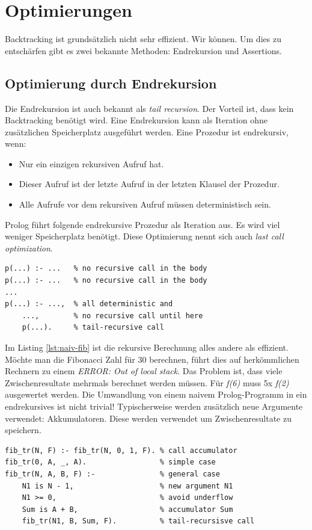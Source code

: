 \section{Optimierungen}
Backtracking ist grundsätzlich nicht sehr effizient. Wir können. Um dies zu entschärfen gibt es zwei bekannte Methoden: Endrekursion und Assertions.

\subsection{Optimierung durch Endrekursion}
Die Endrekursion ist auch bekannt als \emph{tail recursion}. Der Vorteil ist, dass kein Backtracking benötigt wird. Eine Endrekursion kann als Iteration ohne zusätzlichen Speicherplatz ausgeführt werden. Eine Prozedur ist endrekursiv, wenn:

\begin{itemize}
	\item Nur ein einzigen rekursiven Aufruf hat.
	\item Dieser Aufruf ist der letzte Aufruf in der letzten Klausel der Prozedur.
	\item Alle Aufrufe vor dem rekursiven Aufruf müssen deterministisch sein.
\end{itemize}

Prolog führt folgende endrekursive Prozedur als Iteration aus. Es wird viel weniger Speicherplatz benötigt. Diese Optimierung nennt sich auch \emph{last call optimization}.

\begin{lstlisting}[caption=Endrekursion: Allg. Beispiel]
p(...) :- ... 	% no recursive call in the body
p(...) :- ... 	% no recursive call in the body
...
p(...) :- ..., 	% all deterministic and
	..., 		% no recursive call until here
	p(...). 	% tail-recursive call
\end{lstlisting}

Im Listing \ref{lst:naiv-fib} ist die rekursive Berechnung alles andere als effizient. Möchte man die Fibonacci Zahl für 30 berechnen, führt dies auf herkömmlichen Rechnern zu einem \emph{ERROR: Out of local stack}. Das Problem ist, dass viele Zwischenresultate mehrmals berechnet werden müssen. Für \emph{f(6)} muss 5x \emph{f(2)} ausgewertet werden. Die Umwandlung von einem naivem Prolog-Programm in ein endrekursives ist nicht trivial! Typischerweise werden zusätzlich neue Argumente verwendet: Akkumulatoren. Diese werden verwendet um Zwischenresultate zu speichern.

\begin{lstlisting}[caption=Endrekursive Fibonnaci-Berechnung]
fib_tr(N, F) :- fib_tr(N, 0, 1, F). % call accumulator
fib_tr(0, A, _, A). 				% simple case
fib_tr(N, A, B, F) :- 				% general case
	N1 is N - 1, 					% new argument N1
	N1 >= 0, 						% avoid underflow
	Sum is A + B,					% accumulator Sum
	fib_tr(N1, B, Sum, F). 			% tail-recursisve call
\end{lstlisting}

